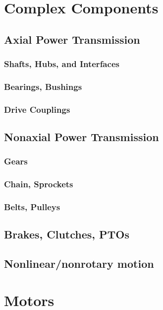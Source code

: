 \documentclass[10pt,letterpaper]{book}
\begin{document}
\chapter{Complex Components}

\section{Axial Power Transmission}
\subsection{Shafts, Hubs, and Interfaces}
	
\subsection{Bearings, Bushings}

\subsection{Drive Couplings}

\section{Nonaxial Power Transmission}
\subsection{Gears}

\subsection{Chain, Sprockets}

\subsection{Belts, Pulleys}

\section{Brakes, Clutches, PTOs}

\section{Nonlinear/nonrotary motion}


\chapter{Motors}
\end{document}
